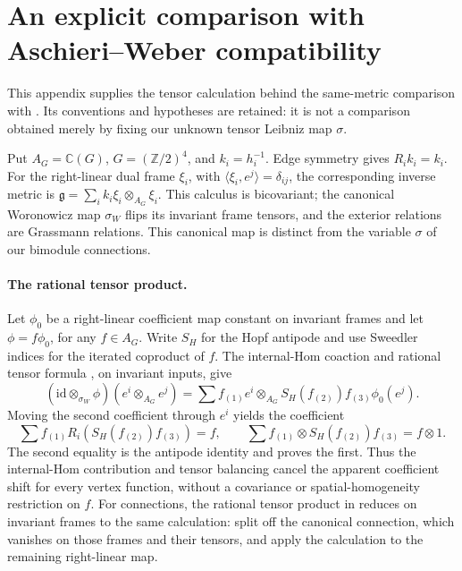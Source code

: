 \documentclass[11pt,a4paper]{article}
\theoremstyle{remark}\newtheorem{remark}[theorem]{Remark}
\begin{document}
\clearpage
\appendix
\section{An explicit comparison with Aschieri--Weber compatibility}
\label{aw:appendix}
This appendix supplies the tensor calculation behind the same-metric
comparison with \cite[Definition~5.3(ii), Theorem~5.7]{orig-aw25}.
Its conventions and hypotheses are retained: it is not a comparison
obtained merely by fixing our unknown tensor Leibniz map $\sigma$.

Put $A_G=\mathbb C(G)$, $G=(\mathbb Z/2)^4$, and $k_i=h_i^{-1}$.
Edge symmetry gives $R_ik_i=k_i$. For the right-linear dual frame
$\xi_i$, with $\langle\xi_i,e^j\rangle=\delta_{ij}$, the corresponding
inverse metric is $\mathfrak g=\sum_i k_i\xi_i\otimes_{A_G}\xi_i$.
This calculus is bicovariant; the canonical Woronowicz map $\sigma_W$
flips its invariant frame tensors, and the exterior relations are
Grassmann relations. This canonical map is distinct from the variable
$\sigma$ of our bimodule connections.

\paragraph{The rational tensor product.}
Let $\phi_0$ be a right-linear coefficient map constant on invariant
frames and let $\phi=f\phi_0$, for any $f\in A_G$. Write $S_H$ for
the Hopf antipode and use Sweedler indices for the iterated coproduct
of $f$. The internal-Hom coaction and rational tensor formula
\cite[equations~(2.2), (2.6), (2.11)]{orig-aw25}, on invariant inputs, give
\[
 (\mathrm{id}\otimes_{\sigma_W}\phi)(e^i\otimes_{A_G}e^j)
 =\sum f_{(1)}e^i\otimes_{A_G}
             S_H(f_{(2)})f_{(3)}\phi_0(e^j).
\]
Moving the second coefficient through $e^i$ yields the coefficient
\[
 \sum f_{(1)}R_i\!\left(S_H(f_{(2)})f_{(3)}\right)=f,
 \qquad
 \sum f_{(1)}\otimes S_H(f_{(2)})f_{(3)}=f\otimes1.
\]
The second equality is the antipode identity and proves the first.
Thus the internal-Hom contribution and tensor balancing cancel the
apparent coefficient shift for every vertex function, without a
covariance or spatial-homogeneity restriction on $f$. For connections,
the rational tensor product in \cite[equation~(2.23), Section~4.4]{orig-aw25}
reduces on invariant frames to the same calculation: split off the
canonical connection, which vanishes on those frames and their tensors,
and apply the calculation to the remaining right-linear map.
\end{document}
